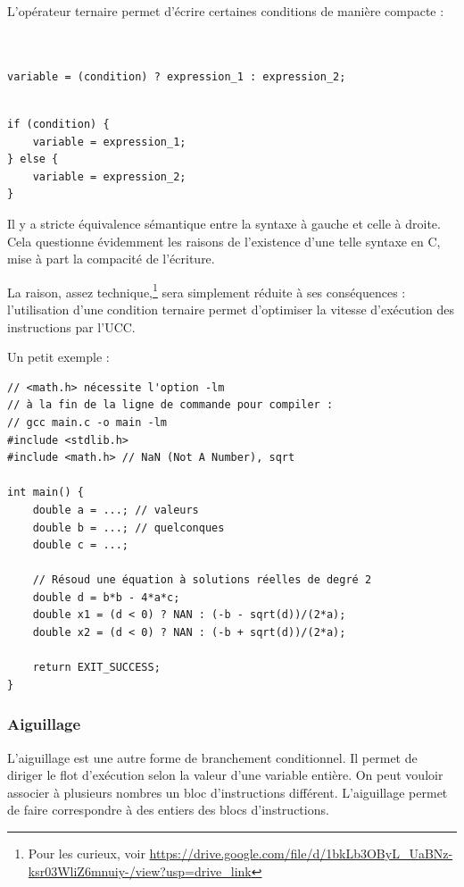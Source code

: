 \documentclass[../../../main.tex]{subfiles}
\begin{document}
L'opérateur ternaire permet d'écrire certaines conditions de manière compacte :
 
\begin{minipage}{0.65\textwidth}
\begin{verbatim}


variable = (condition) ? expression_1 : expression_2;


\end{verbatim}
\end{minipage}
\begin{minipage}{0.35\textwidth}
\begin{verbatim}
if (condition) {
	variable = expression_1;
} else {
	variable = expression_2;
}
\end{verbatim}
\end{minipage}
 
Il y a stricte équivalence sémantique entre la syntaxe à gauche et celle à droite. Cela questionne évidemment les raisons de l'existence d'une telle syntaxe en C, mise à part la compacité de l'écriture.
 
La raison, assez technique,\footnote{Pour les curieux, voir \url{https://drive.google.com/file/d/1bkLb3OByL_UaBNz-ksr03WliZ6mnuiy-/view?usp=drive_link}} sera simplement réduite à ses conséquences : l'utilisation d'une condition ternaire permet d'optimiser la vitesse d'exécution des instructions par l'UCC.
 
Un petit exemple :
\begin{verbatim}
// <math.h> nécessite l'option -lm
// à la fin de la ligne de commande pour compiler :
// gcc main.c -o main -lm
#include <stdlib.h>
#include <math.h> // NaN (Not A Number), sqrt

int main() {
	double a = ...; // valeurs
	double b = ...; // quelconques
	double c = ...;

	// Résoud une équation à solutions réelles de degré 2
	double d = b*b - 4*a*c;
	double x1 = (d < 0) ? NAN : (-b - sqrt(d))/(2*a);
	double x2 = (d < 0) ? NAN : (-b + sqrt(d))/(2*a);

	return EXIT_SUCCESS;
}
\end{verbatim}
\subsubsection{Aiguillage}
 
L'aiguillage est une autre forme de branchement conditionnel. Il permet de diriger le flot d'exécution selon la valeur d'une variable entière. On peut vouloir associer à plusieurs nombres un bloc d'instructions différent. L'aiguillage permet de faire correspondre à des entiers des blocs d'instructions.
 
\end{document}

